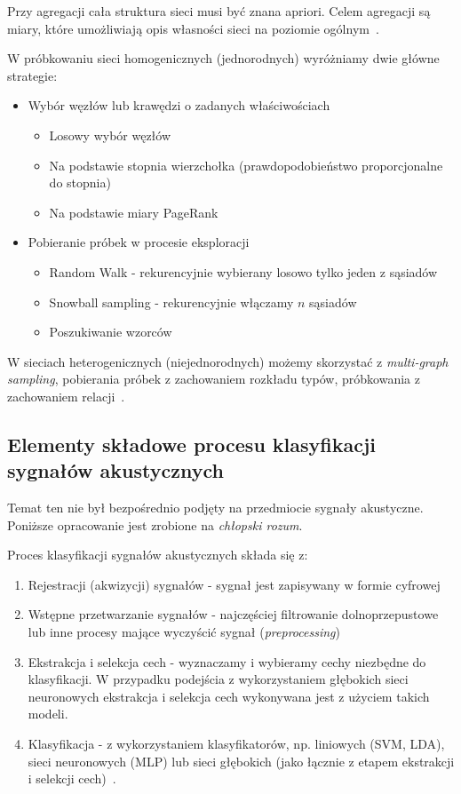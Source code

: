 \documentclass[wi]{zut}
\begin{document}
Przy agregacji cała struktura sieci musi być znana apriori. Celem agregacji są miary, które umożliwiają opis własności sieci na poziomie ogólnym~\cite{Jankowski2020_probkowanie}. 

W próbkowaniu sieci homogenicznych (jednorodnych) wyróżniamy dwie główne strategie:

\begin{itemize}
    \item Wybór węzłów lub krawędzi o zadanych właściwościach
    \begin{itemize}
        \item Losowy wybór węzłów
        \item Na podstawie stopnia wierzchołka (prawdopodobieństwo proporcjonalne do stopnia)
        \item Na podstawie miary PageRank
    \end{itemize}
    \item Pobieranie próbek w procesie eksploracji
    \begin{itemize}
        \item Random Walk - rekurencyjnie wybierany losowo tylko jeden z sąsiadów
        \item Snowball sampling - rekurencyjnie włączamy $n$ sąsiadów
        \item Poszukiwanie wzorców
    \end{itemize}
\end{itemize}

W sieciach heterogenicznych (niejednorodnych) możemy skorzystać z \emph{multi-graph sampling}, pobierania próbek z zachowaniem rozkładu typów, próbkowania z zachowaniem relacji~\cite{Jankowski2020_probkowanie}.


\subsection{Elementy składowe procesu klasyfikacji sygnałów akustycznych}

Temat ten nie był bezpośrednio podjęty na przedmiocie sygnały akustyczne. Poniższe opracowanie jest zrobione na \textit{chłopski rozum}.
\question

Proces klasyfikacji sygnałów akustycznych składa się z:

\begin{enumerate}
    \item Rejestracji (akwizycji) sygnałów - sygnał jest zapisywany w formie cyfrowej
    \item Wstępne przetwarzanie sygnałów - najczęściej filtrowanie dolnoprzepustowe lub inne procesy mające wyczyścić sygnał (\textit{preprocessing})
    \item Ekstrakcja i selekcja cech - wyznaczamy i wybieramy cechy niezbędne do klasyfikacji. W przypadku podejścia z wykorzystaniem głębokich sieci neuronowych ekstrakcja i selekcja cech wykonywana jest z użyciem takich modeli.
    \item Klasyfikacja - z wykorzystaniem klasyfikatorów, np. liniowych (SVM, LDA), sieci neuronowych (MLP) lub sieci głębokich (jako łącznie z etapem ekstrakcji i selekcji cech)~\cite{jagodzinska2019klasyfikacja}.
\end{enumerate}
\end{document}
